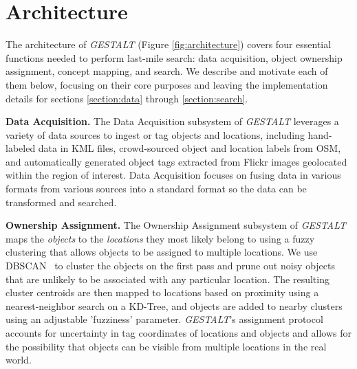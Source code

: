 \section{Architecture}
\label{section:architecture}

\begin{figure*}[t]
    
    \centering
    \caption[width=\textwidth]{\emph{GESTALT} consists of a data collection module, an ownership assignment module, a concept mapping module, and a search module.}
    \label{fig:architecture}
\end{figure*}



The architecture of \textit{GESTALT} (Figure \ref{fig:architecture}) covers four essential functions needed to perform last-mile search: data acquisition, object ownership assignment, concept mapping, and search. 
We describe and motivate each of them below, focusing on their core purposes and leaving the implementation details for sections \ref{section:data} through \ref{section:search}. 

\textbf{Data Acquisition.}
The Data Acquisition subsystem of \emph{GESTALT} leverages a variety of data sources to ingest or tag objects and locations, including hand-labeled data in KML files, crowd-sourced object and location labels from OSM, and automatically generated object tags extracted from Flickr images geolocated within the region of interest. 
Data Acquisition focuses on fusing data in various formats from various sources into a standard format so the data can be transformed and searched.

\textbf{Ownership Assignment.}
The Ownership Assignment subsystem of \emph{GESTALT} maps the \textit{objects} to the \textit{locations} they most likely belong to using a fuzzy clustering that allows objects to be assigned to multiple locations. 
We use DBSCAN~\cite{DBSCAN} to cluster the objects on the first pass and prune out noisy objects that are unlikely to be associated with any particular location.
The resulting cluster centroids are then mapped to locations based on proximity using a nearest-neighbor search on a KD-Tree, and objects are added to nearby clusters using an adjustable 'fuzziness' parameter.
\emph{GESTALT}'s assignment protocol accounts for uncertainty in tag coordinates of locations and objects and allows for the possibility that objects can be visible from multiple locations in the real world.

